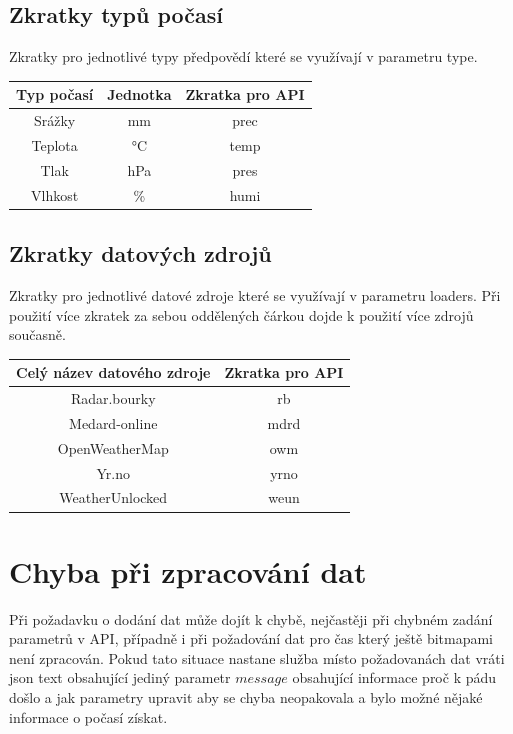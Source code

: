 \documentclass[czech,bachelor,dept460,male,csharp,cpdeclaration]{diploma}
\begin{document}
	\subsection{Zkratky typů počasí}
	
	Zkratky pro jednotlivé typy předpovědí které se využívají v parametru type.
	
	\begin{center}
		\begin{tabular}{c c c}
			Typ počasí & Jednotka & Zkratka pro API\\
			\midrule
			Srážky & mm & prec \\
			Teplota & °C & temp \\
			Tlak & hPa & pres \\
			Vlhkost & \% & humi \\
		\end{tabular}
	\end{center}
	
	\subsection{Zkratky datových zdrojů}
	
	Zkratky pro jednotlivé datové zdroje které se využívají v parametru loaders. Při použití více zkratek za sebou oddělených čárkou dojde k použití více zdrojů současně.
	
	\begin{center}
		\begin{tabular}{c c}
			Celý název datového zdroje & Zkratka pro API\\
			\midrule
			Radar.bourky & rb \\
			Medard-online & mdrd \\
			OpenWeatherMap & owm \\
			Yr.no & yrno \\
			WeatherUnlocked & weun \\
		\end{tabular}
	\end{center}
	
	\section{Chyba při zpracování dat}
	
	Při požadavku o dodání dat může dojít k chybě, nejčastěji při chybném zadání parametrů v API, případně i při požadování dat pro čas který ještě bitmapami není zpracován. Pokud tato situace nastane služba místo požadovanách dat vráti json text obsahující jediný parametr $message$ obsahující informace proč k pádu došlo a jak parametry upravit aby se chyba neopakovala a bylo možné nějaké informace o počasí získat.
	
\end{document}
